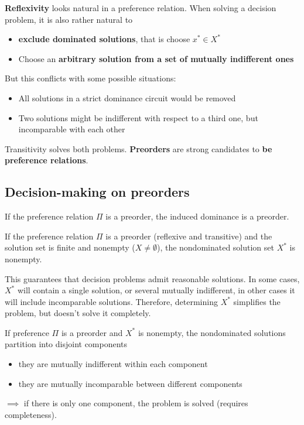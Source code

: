 \textbf{Reflexivity} looks natural in a preference relation. When solving a decision problem, it is also rather natural to 
\begin{itemize}
	\item \textbf{exclude dominated solutions}, that is choose $x^\ast \in X^\ast$
	
	\item Choose an \textbf{arbitrary solution from a set of mutually indifferent ones}
\end{itemize}

But this conflicts with some possible situations: 
\begin{itemize}
	\item All solutions in a strict dominance circuit would be removed
	
	\item Two solutions might be indifferent with respect to a third one, but incomparable with each other
\end{itemize}

Transitivity solves both problems. \textbf{Preorders} are strong candidates to \textbf{be preference relations}.

\subsection{Decision-making on preorders}
\label{subsec:decisionmakingpreorders}

\begin{theo}
	If the preference relation $\Pi$ is a preorder, the induced dominance is a preorder. \\
\end{theo}

\begin{theo}
	If the preference relation $\Pi$ is a preorder (reflexive and transitive) and the solution set is finite and nonempty ($X \neq \emptyset$), the nondominated solution set $X^\ast$ is nonempty.
\end{theo}

This guarantees that decision problems admit reasonable solutions. In some cases, $X^\ast$ will contain a single solution, or several mutually indifferent, in other cases it will include incomparable solutions. Therefore, determining $X^\ast$ simplifies the problem, but doesn't solve it completely. \\

\begin{theo}
	If preference $\Pi$ is a preorder and $X^\ast$ is nonempty, the nondominated solutions partition into disjoint components
	\begin{itemize}
		\item they are mutually indifferent within each component
		
		\item they are mutually incomparable between different components
	\end{itemize}
	$\implies$ if there is only one component, the problem is solved (requires completeness).
\end{theo}

